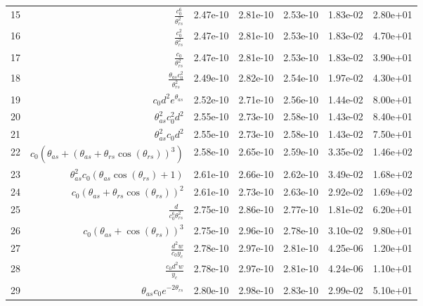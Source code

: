 \begin{tabularx}{\textwidth}{lRRRRRl}
15  &  $ \displaystyle\frac{c_{0}^{6}}{\theta_{rs}^{2}} $  &  2.47e-10  &  2.81e-10  &  2.53e-10  &  1.83e-02  &  2.80e+01  \\ 
16  &  $ \displaystyle\frac{c_{0}^{2}}{\theta_{rs}^{2}} $  &  2.47e-10  &  2.81e-10  &  2.53e-10  &  1.83e-02  &  4.70e+01  \\ 
17  &  $ \displaystyle\frac{c_{0}}{\theta_{rs}^{2}} $  &  2.47e-10  &  2.81e-10  &  2.53e-10  &  1.83e-02  &  3.90e+01  \\ 
18  &  $ \displaystyle\frac{\theta_{as} c_{0}^{2}}{\theta_{rs}^{2}} $  &  2.49e-10  &  2.82e-10  &  2.54e-10  &  1.97e-02  &  4.30e+01  \\ 
19  &  $ c_{0} d^{2} e^{\theta_{as}} $  &  2.52e-10  &  2.71e-10  &  2.56e-10  &  1.44e-02  &  8.00e+01  \\ 
20  &  $ \theta_{as}^{2} c_{0}^{2} d^{2} $  &  2.55e-10  &  2.73e-10  &  2.58e-10  &  1.43e-02  &  8.40e+01  \\ 
21  &  $ \theta_{as}^{2} c_{0} d^{2} $  &  2.55e-10  &  2.73e-10  &  2.58e-10  &  1.43e-02  &  7.50e+01  \\ 
22  &  $ c_{0} \left(\theta_{as} + \left(\theta_{as} + \theta_{rs} \cos{\left(\theta_{rs} \right)}\right)^{3}\right) $  &  2.58e-10  &  2.65e-10  &  2.59e-10  &  3.35e-02  &  1.46e+02  \\ 
23  &  $ \theta_{as}^{2} c_{0} \left(\theta_{as} \cos{\left(\theta_{rs} \right)} + 1\right) $  &  2.61e-10  &  2.66e-10  &  2.62e-10  &  3.49e-02  &  1.68e+02  \\ 
24  &  $ c_{0} \left(\theta_{as} + \theta_{rs} \cos{\left(\theta_{rs} \right)}\right)^{2} $  &  2.61e-10  &  2.73e-10  &  2.63e-10  &  2.92e-02  &  1.69e+02  \\ 
25  &  $ \displaystyle\frac{d}{c_{0}^{6} \theta_{rs}^{2}} $  &  2.75e-10  &  2.86e-10  &  2.77e-10  &  1.81e-02  &  6.20e+01  \\ 
26  &  $ c_{0} \left(\theta_{as} + \cos{\left(\theta_{rs} \right)}\right)^{3} $  &  2.75e-10  &  2.96e-10  &  2.78e-10  &  3.10e-02  &  9.80e+01  \\ 
27  &  $ \displaystyle\frac{d^{2} w}{c_{0} y_c} $  &  2.78e-10  &  2.97e-10  &  2.81e-10  &  4.25e-06  &  1.20e+01  \\ 
28  &  $ \displaystyle\frac{c_{0} d^{2} w}{y_c} $  &  2.78e-10  &  2.97e-10  &  2.81e-10  &  4.24e-06  &  1.10e+01  \\ 
29  &  $ \theta_{as} c_{0} e^{- 2 \theta_{rs}} $  &  2.80e-10  &  2.98e-10  &  2.83e-10  &  2.99e-02  &  5.10e+01  \\ 

\end{tabularx}

